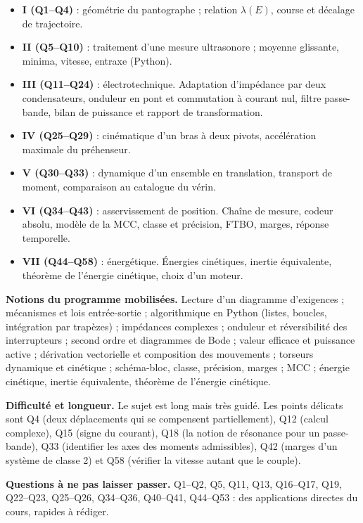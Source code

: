 \documentclass[11pt,a4paper]{article}
\providecommand{\tightlist}{\setlength{\itemsep}{0pt}\setlength{\parskip}{0pt}}
\begin{document}
\begin{itemize}
\tightlist
\item
  \textbf{I (Q1--Q4)} : géométrie du pantographe ; relation \(\lambda(E)\), course et décalage de trajectoire.
\item
  \textbf{II (Q5--Q10)} : traitement d'une mesure ultrasonore ; moyenne glissante, minima, vitesse, entraxe (Python).
\item
  \textbf{III (Q11--Q24)} : électrotechnique. Adaptation d'impédance par deux condensateurs, onduleur en pont et commutation à courant nul, filtre passe-bande, bilan de puissance et rapport de transformation.
\item
  \textbf{IV (Q25--Q29)} : cinématique d'un bras à deux pivots, accélération maximale du préhenseur.
\item
  \textbf{V (Q30--Q33)} : dynamique d'un ensemble en translation, transport de moment, comparaison au catalogue du vérin.
\item
  \textbf{VI (Q34--Q43)} : asservissement de position. Chaîne de mesure, codeur absolu, modèle de la MCC, classe et précision, FTBO, marges, réponse temporelle.
\item
  \textbf{VII (Q44--Q58)} : énergétique. Énergies cinétiques, inertie équivalente, théorème de l'énergie cinétique, choix d'un moteur.
\end{itemize}

\textbf{Notions du programme mobilisées.} Lecture d'un diagramme d'exigences ; mécanismes et lois entrée-sortie ; algorithmique en Python (listes, boucles, intégration par trapèzes) ; impédances complexes ; onduleur et réversibilité des interrupteurs ; second ordre et diagrammes de Bode ; valeur efficace et puissance active ; dérivation vectorielle et composition des mouvements ; torseurs dynamique et cinétique ; schéma-bloc, classe, précision, marges ; MCC ; énergie cinétique, inertie équivalente, théorème de l'énergie cinétique.

\textbf{Difficulté et longueur.} Le sujet est long mais très guidé. Les points délicats sont Q4 (deux déplacements qui se compensent partiellement), Q12 (calcul complexe), Q15 (signe du courant), Q18 (la notion de résonance pour un passe-bande), Q33 (identifier les axes des moments admissibles), Q42 (marges d'un système de classe 2) et Q58 (vérifier la vitesse autant que le couple).

\textbf{Questions à ne pas laisser passer.} Q1--Q2, Q5, Q11, Q13, Q16--Q17, Q19, Q22--Q23, Q25--Q26, Q34--Q36, Q40--Q41, Q44--Q53 : des applications directes du cours, rapides à rédiger.
\end{document}
